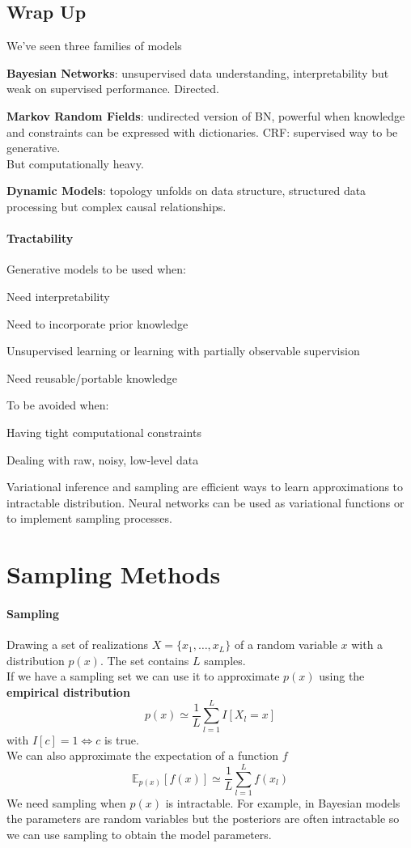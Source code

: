 \documentclass[10pt]{report}
\begin{document}
\subsection{Wrap Up}
We've seen three families of models\begin{list}{}{}
	\item \textbf{Bayesian Networks}: unsupervised data understanding, interpretability but weak on supervised performance. Directed.
	\item \textbf{Markov Random Fields}: undirected version of BN, powerful when knowledge and constraints can be expressed with dictionaries. CRF: supervised way to be generative.\\
	But computationally heavy.
	\item \textbf{Dynamic Models}: topology unfolds on data structure, structured data processing but complex causal relationships.
\end{list}
\paragraph{Tractability} Generative models to be used when:
\begin{list}{}{}
	\item Need interpretability
	\item Need to incorporate prior knowledge
	\item Unsupervised learning or learning with partially observable supervision
	\item Need reusable/portable knowledge
\end{list}
To be avoided when:
\begin{list}{}{}
	\item Having tight computational constraints
	\item Dealing with raw, noisy, low-level data
\end{list}
Variational inference and sampling are efficient ways to learn approximations to intractable distribution. Neural networks can be used as variational functions or to implement sampling processes.
\section{Sampling Methods} 
\paragraph{Sampling} Drawing a set of realizations $X = \{x_1,\ldots,x_L\}$ of a random variable $x$ with a distribution $p(x)$. The set contains $L$ samples.\\
If we have a sampling set we can use it to approximate $p(x)$ using the \textbf{empirical distribution} $$p(x)\simeq \frac{1}{L}\sum_{l=1}^L I[X_l = x]$$ with $I[c] = 1 \Leftrightarrow c$ is true.\\
We can also approximate the expectation of a function $f$ $$\mathbb{E}_{p(x)}[f(x)]\simeq \frac{1}{L}\sum_{l=1}^L f(x_l)$$
We need sampling when $p(x)$ is intractable. For example, in Bayesian models the parameters are random variables but the posteriors are often intractable so we can use sampling to obtain the model parameters.
\end{document}
